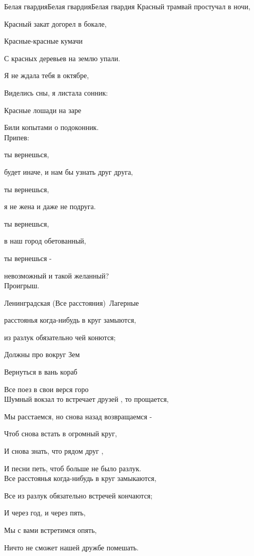 \documentclass[11pt,a5paper]{book}
\renewcommand{\tt}{\indent \indent}
\begin{document}
\begin{song}{Белая гвардия}{}{Белая гвардия}{Белая гвардия}{}{}
Красный трамвай простучал в ночи,\par
Красный закат догорел в бокале,\par
Красные-красные кумачи\par
С красных деревьев на землю упали.\par
Я не ждала тебя в октябре,\par
Виделись сны, я листала сонник:\par
Красные лошади на заре\par
Били копытами о подоконник.\\

Припев:\par
{} ты вернешься,\par
{} будет иначе, и нам бы узнать друг друга,\par
{} ты вернешься,\par
{} я не жена и даже не подруга.\par
{} ты вернешься,\par
{} в наш город обетованный,\par
{} ты вернешься -\par
{} невозможный и такой желанный?\\

Проигрыш.\par


\end{song}


\begin{song}{Ленинградская (Все расстояния)}{}{~}{Лагерные}{}{}

 расстоянья когда-нибудь в круг замыются,\par
{} из разлук обязательно чей конются;\par
Должны про вокруг Зем\par
Вернуться в вань кораб\par   
Все поез в свои верся горо\\
 
Шумный вокзал то встречает друзей , то прощается,\par
Мы расстаемся, но снова назад возвращаемся -\par
Чтоб снова встать в огромный круг,\par
И снова знать, что рядом друг ,\par
И песни петь, чтоб больше не было разлук.\\
 
Все расстоянья когда-нибудь в круг замыкаются,\par
Все из разлук обязательно встречей кончаются;\par
И через год, и через пять,\par
Мы с вами встретимся опять,\par
Ничто не сможет нашей дружбе помешать.\par

\end{song}
\end{document}
